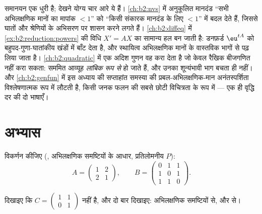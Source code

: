 \begin{remark}[इसी खंड के भीतर के परिप्रेक्ष्य]\label{rem:b2:reduction:perspectives}
समानयन एक धुरी है; देखने योग्य चार आरे ये हैं। \cref{ch:b2:nvs} में अनुकूलित
मानदंड ``सभी अभिलक्षणिक मानों का मापांक $< 1$'' को ``किसी संकारक मानदंड
के लिए $< 1$'' में बदल देते हैं, जिससे  घातों और श्रेणियों के
अभिसरण पर शासन करने लगते हैं। \cref{ch:b2:diffeq} में \cref{ex:b2:reduction:powers} की विधि $X' = AX$ का सामान्य हल बन
जाती है: डनफ़र्ड $\eu^{tA}$ को बहुपद-गुणा-घातांकीय खंडों में बाँट देता है, और
स्थायित्व अभिलक्षणिक मानों के वास्तविक भागों से पढ़ लिया जाता है। \cref{ch:b2:quadratic}
में एक अदिश गुणन वह करा देता है जो केवल रैखिक बीजगणित नहीं करा सकता:
सममित आव्यूह \emph{लांबिक रूप से}  हो जाते हैं, और उनका
शून्यंभावी भाग बचता ही नहीं। और \cref{ch:b2:genfun} में इस अध्याय की सप्ताहांत समस्या
की प्रबल-अभिलक्षणिक-मान अनंतस्पर्शिता विश्लेषणात्मक रूप में लौटती है,
किसी जनक फलन की सबसे छोटी विचित्रता के रूप में --- एक ही वृद्धि दर की
दो भाषाएँ।
\end{remark}

\section{अभ्यास}

\begin{exercise}[$\star$]\label{exo:b2:reduction:1}
विकर्णन कीजिए (, अभिलक्षणिक समष्टियों के आधार,
प्रतिलोमनीय $P$):
\[
A = \begin{pmatrix} 1 & 2\\ 2 & 1 \end{pmatrix},
\qquad
B = \begin{pmatrix} 0 & 1 & 1\\ 1 & 0 & 1\\ 1 & 1 & 0
\end{pmatrix}.
\]
\end{exercise}

\begin{exercise}[$\star$]\label{exo:b2:reduction:2}
दिखाइए कि $C = \begin{pmatrix} 1 & 1\\ 0 & 1\end{pmatrix}$  नहीं है, और दो बार दिखाइए: अभिलक्षणिक
समष्टियों से, और  से।
\end{exercise}

